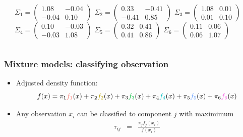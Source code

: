 \begin{frame}[t]
\begin{columns}
{\noindent\rule{4cm}{0.4pt}

{\tiny
$\Sigma_1 = \left(\begin{array}{cc}1.08 & -0.04\\ -0.04 & 0.10 \end{array}\right)$ 
$\Sigma_2 = \left(\begin{array}{cc}0.33 & -0.41\\ -0.41 & 0.85 \end{array}\right)$
$\Sigma_3 = \left(\begin{array}{cc}1.08 & 0.01\\ 0.01 & 0.10 \end{array}\right)$ 
$\Sigma_4 = \left(\begin{array}{cc}0.10 & -0.03\\ -0.03 & 1.08 \end{array}\right)$
$\Sigma_5 = \left(\begin{array}{cc}0.32 & 0.41\\ 0.41 & 0.86 \end{array}\right)$ 
$\Sigma_6 = \left(\begin{array}{cc}0.11 & 0.06\\  0.06 & 1.07 \end{array}\right)$
}
}
\end{columns}
\end{frame}


\begin{frame}
\frametitle{Mixture models: classifying observation}

\begin{itemize}
\item Adjusted density function:
\[
f(x) = \pi_1 \gga{f_1}(x) + \pi_2 \ggb{f_2}(x) + \pi_3 \ggc{f_3}(x) + \pi_4 \ggd{f_4}(x) + \pi_5 \gge{f_5}(x) + \pi_6 \ggf{f_6}(x)
\]
\item Any observation $x_i$ can be classified to component $j$ with maximimum
\begin{eqnarray*} \tau_{ij} &=& \frac{\pi_j f_j(x_i)}{f(x_i) } \end{eqnarray*}
\end{itemize}

\end{frame}

